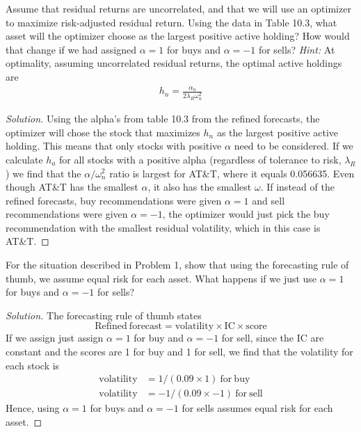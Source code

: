 \begin{problem}{10.1}
  Assume that residual returns are uncorrelated, and that we will use an optimizer to maximize risk-adjusted residual return. Using the data in Table 10.3, what asset will the optimizer choose as the largest positive active holding? How would that change if we had assigned $\alpha=1$ for buys and $\alpha=-1$ for sells? \textit{Hint:} At optimality, assuming uncorrelated residual returns, the optimal active holdings are
  \begin{align*}
   h_{n} = \frac{\alpha_{n}}{2\lambda_{R}\omega_{n}^{2}}
  \end{align*}

\end{problem}

\begin{proof}[Solution]
  Using the alpha's from table 10.3 from the refined forecasts, the optimizer will chose the stock that maximizes $h_{n}$ as the largest positive active holding. This means that only stocks with positive $\alpha$ need to be considered. If we calculate $h_{a}$ for all stocks with a positive alpha (regardless of tolerance to risk, $\lambda_{R}$) we find that the $\alpha/\omega_{n}^{2}$ ratio is largest for AT\&T, where it equals 0.056635. Even though AT\&T has the smallest $\alpha$, it also has the smallest $\omega$. If instead of the refined forecasts, buy recommendations were given $\alpha=1$ and sell recommendations were given $\alpha=-1$, the optimizer would just pick the buy recommendation with the smallest residual volatility, which in this case is AT\&T.
\end{proof}

\begin{problem}{10.2}
  For the situation described in Problem 1, show that using the forecasting rule of thumb, we assume equal risk for each asset. What happens if we just use $\alpha=1$ for buys and $\alpha=-1$ for sells?
\end{problem}

\begin{proof}[Solution]
  The forecasting rule of thumb states
  \begin{equation*}
   \mathrm{Refined~forecast} = \mathrm{volatility}\times\mathrm{IC}\times\mathrm{score}
  \end{equation*}
  If we assign just assign $\alpha=1$ for buy and $\alpha=-1$ for sell, since the IC are constant and the scores are 1 for buy and 1 for sell, we find that the volatility for each stock is
  \begin{align*}
   \mathrm{volatility} &= 1 / (0.09\times 1) \mathrm{~for~buy}\\
   \mathrm{volatility} &= -1 / (0.09\times -1) \mathrm{~for~sell}
  \end{align*}
  Hence, using $\alpha=1$ for buys and $\alpha=-1$ for sells assumes equal risk for each asset.

  
\end{proof}


